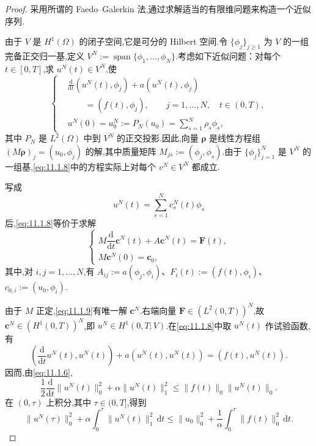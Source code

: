 \begin{proof}
采用所谓的 Faedo--Galerkin 法,通过求解适当的有限维问题来构造一个近似序列.

由于 \(V\) 是 \(H^1(\Omega)\) 的闭子空间,它是可分的 Hilbert 空间.令 \(\{\phi_j\}_{j\ge1}\) 为 \(V\) 的一组完备正交归一基,定义 \(V^N:=\operatorname{span}\{\phi_1,\ldots,\phi_N\}\).考虑如下近似问题：对每个 \(t\in[0,T]\),求 \(u^N(t)\in V^N\),使
\begin{equation}\label{eq:11.1.8}
  \left\{
  \begin{aligned}
    &\frac{\mathrm d}{\mathrm dt}(u^N(t),\phi_j)+a(u^N(t),\phi_j)\\
    &\qquad=(f(t),\phi_j),\qquad j=1,\ldots,N,\quad t\in(0,T),\\
    &u^N(0)=u_0^N:=P_N(u_0)=\sum_{s=1}^N\rho_s\phi_s,
  \end{aligned}
  \right.
\end{equation}
其中 \(P_N\) 是 \(L^2(\Omega)\) 中到 \(V^N\) 的正交投影.因此,向量 \(\boldsymbol{\rho}\) 是线性方程组 \((M\boldsymbol{\rho})_j=(u_0,\phi_j)\) 的解,其中质量矩阵 \(M_{js}:=(\phi_j,\phi_s)\).由于 \(\{\phi_j\}_{j=1}^N\) 是 \(V^N\) 的一组基,\eqref{eq:11.1.8}中的方程实际上对每个 \(v^N\in V^N\) 都成立.

写成
\[
  u^N(t)=\sum_{s=1}^N c_s^N(t)\phi_s
\]
后,\eqref{eq:11.1.8}等价于求解
\begin{equation}\label{eq:11.1.9}
  \begin{cases}
    M\dfrac{\mathrm d}{\mathrm dt}\boldsymbol{c}^N(t)+A\boldsymbol{c}^N(t)=\boldsymbol{F}(t),\\
    M\boldsymbol{c}^N(0)=\boldsymbol{c}_0,
  \end{cases}
\end{equation}
其中,对 \(i,j=1,\ldots,N\),有 \(A_{ij}:=a(\phi_j,\phi_i)\)、\(F_i(t):=(f(t),\phi_i)\)、\(c_{0,i}:=(u_0,\phi_i)\).

由于 \(M\) 正定,\eqref{eq:11.1.9}有唯一解 \(\boldsymbol{c}^N\).右端向量 \(\boldsymbol{F}\in(L^2(0,T))^N\),故 \(\boldsymbol{c}^N\in(H^1(0,T))^N\),即 \(u^N\in H^1(0,T;V)\).在\eqref{eq:11.1.8}中取 \(u^N(t)\) 作试验函数,有
\[
  \left(\frac{\mathrm d}{\mathrm dt}u^N(t),u^N(t)\right)
    +a(u^N(t),u^N(t))=(f(t),u^N(t)).
\]
因而,由\eqref{eq:11.1.6},
\[
  \frac12\frac{\mathrm d}{\mathrm dt}\|u^N(t)\|_0^2+\alpha\|u^N(t)\|_1^2
       \le\|f(t)\|_0\|u^N(t)\|_0.
\]
在 \((0,\tau)\) 上积分,其中 \(\tau\in(0,T]\),得到
\begin{equation}\label{eq:11.1.10}
  \|u^N(\tau)\|_0^2+\alpha\int_0^\tau\|u^N(t)\|_1^2\,\mathrm dt
      \le\|u_0\|_0^2+\frac1\alpha\int_0^\tau\|f(t)\|_0^2\,\mathrm dt.
\end{equation}


\end{proof}
